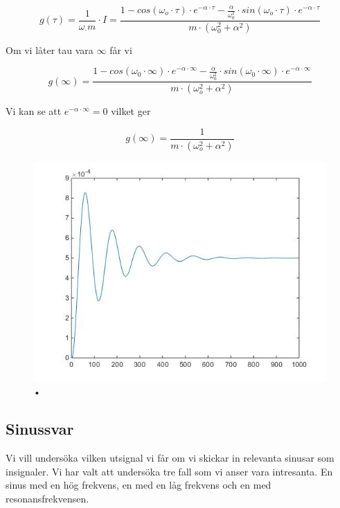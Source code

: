 \documentclass[10pt,a4paper]{article}
\begin{document}
\begin{equation}
g(\tau)= \frac{1}{\omega_ \cdot m} \cdot I = \frac{1-cos(\omega_o \cdot \tau) \cdot e^{-\alpha \cdot \tau} - \frac{\alpha}{\omega_0^2} \cdot sin(\omega_o \cdot \tau) \cdot e^{-\alpha \cdot \tau}}{m\cdot (\omega_0^2 + \alpha^2)}
\end{equation}

Om vi låter tau vara $\infty$ får vi

\begin{equation}
g(\infty) = \frac{1 - cos(\omega_0 \cdot \infty) \cdot e^{-\alpha \cdot \infty}
- \frac{\alpha}{\omega_0^2} \cdot sin(\omega_0 \cdot \infty) \cdot e^{-\alpha \cdot \infty}}{m \cdot (\omega_o^2 +\alpha^2)}
\end{equation}

Vi kan se att $e^{-\alpha \cdot \infty} = 0$ vilket ger

\begin{equation}
g(\infty) = \frac{1}{m \cdot (\omega_o^2 +\alpha^2)}
\end{equation}

\begin{figure}
\begin{center}
\includegraphics[scale=0.5]{Stegsvar}
\caption{•}
\end{center}
\end{figure}


\subsection{Sinussvar}
Vi vill undersöka vilken utsignal vi får om vi skickar in relevanta sinusar som insignaler. Vi har valt att undersöka tre fall som vi anser vara intresanta. En sinus med en hög frekvens, en med en låg frekvens och en med resonansfrekvensen.
\end{document}

